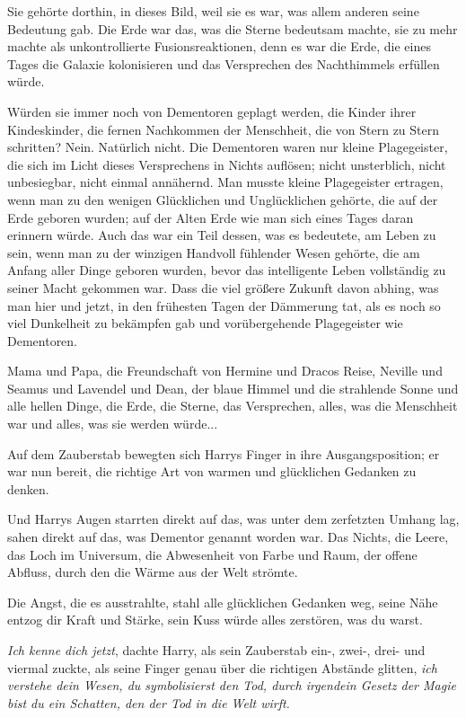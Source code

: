 {Sie gehörte dorthin, in dieses Bild, weil sie es war, was allem anderen seine Bedeutung gab. Die Erde war das, was die Sterne bedeutsam machte, sie zu mehr machte als unkontrollierte Fusionsreaktionen, denn es war die Erde, die eines Tages die Galaxie kolonisieren und das Versprechen des Nachthimmels erfüllen würde.

Würden sie immer noch von Dementoren geplagt werden, die Kinder ihrer Kindeskinder, die fernen Nachkommen der Menschheit, die von Stern zu Stern schritten? Nein. Natürlich nicht. Die Dementoren waren nur kleine Plagegeister, die sich im Licht dieses Versprechens in Nichts auflösen; nicht unsterblich, nicht unbesiegbar, nicht einmal annähernd. Man musste kleine Plagegeister ertragen, wenn man zu den wenigen Glücklichen und Unglücklichen gehörte, die auf der Erde geboren wurden; auf der Alten Erde wie man sich eines Tages daran erinnern würde. Auch das war ein Teil dessen, was es bedeutete, am Leben zu sein, wenn man zu der winzigen Handvoll fühlender Wesen gehörte, die am Anfang aller Dinge geboren wurden, bevor das intelligente Leben vollständig zu seiner Macht gekommen war. Dass die viel größere Zukunft davon abhing, was man hier und jetzt, in den frühesten Tagen der Dämmerung tat, als es noch so viel Dunkelheit zu bekämpfen gab und vorübergehende Plagegeister wie Dementoren.

Mama und Papa, die Freundschaft von Hermine und Dracos Reise, Neville und Seamus und Lavendel und Dean, der blaue Himmel und die strahlende Sonne und alle hellen Dinge, die Erde, die Sterne, das Versprechen, alles, was die Menschheit war und alles, was sie werden würde...

Auf dem Zauberstab bewegten sich Harrys Finger in ihre Ausgangsposition; er war nun bereit, die richtige Art von warmen und glücklichen Gedanken zu denken.

Und Harrys Augen starrten direkt auf das, was unter dem zerfetzten Umhang lag, sahen direkt auf das, was Dementor genannt worden war. Das Nichts, die Leere, das Loch im Universum, die Abwesenheit von Farbe und Raum, der offene Abfluss, durch den die Wärme aus der Welt strömte.

Die Angst, die es ausstrahlte, stahl alle glücklichen Gedanken weg, seine Nähe entzog dir Kraft und Stärke, sein Kuss würde alles zerstören, was du warst.

\emph{Ich kenne dich jetzt}, dachte Harry, als sein Zauberstab ein-, zwei-, drei- und viermal zuckte, als seine Finger genau über die richtigen Abstände glitten, \emph{ich verstehe dein Wesen, du symbolisierst den Tod, durch irgendein Gesetz der Magie bist du ein Schatten, den der Tod in die Welt wirft.}

}
